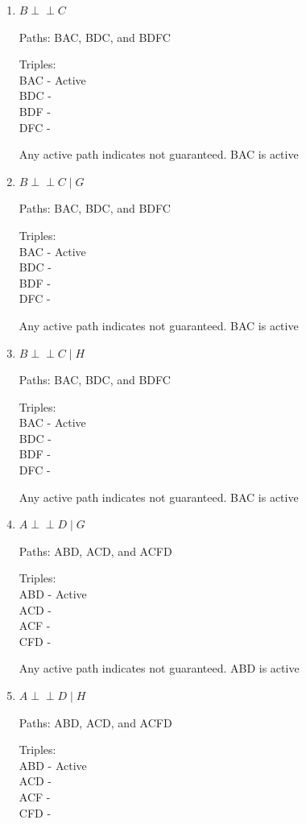 \documentclass[12pt]{article}
\newcommand{\indep}{\perp\!\!\!\perp}
\begin{document}
\begin{enumerate}

\item $B \indep C$ 

Paths: BAC, BDC, and BDFC

Triples: \\
BAC - Active \\
BDC - \\
BDF - \\
DFC - 

Any active path indicates not guaranteed. BAC is active

\item $B \indep C \mid G$ 

Paths: BAC, BDC, and BDFC

Triples: \\
BAC - Active \\
BDC - \\
BDF - \\
DFC - 

Any active path indicates not guaranteed. BAC is active

\item $B \indep C \mid H$ 

Paths: BAC, BDC, and BDFC

Triples: \\
BAC - Active \\
BDC - \\
BDF - \\
DFC - 

Any active path indicates not guaranteed. BAC is active

\item $A \indep D \mid G$ 

Paths: ABD, ACD, and ACFD

Triples: \\
ABD - Active \\
ACD - \\
ACF -  \\
CFD - 

Any active path indicates not guaranteed. ABD is active

\item $A \indep D \mid H$

Paths: ABD, ACD, and ACFD

Triples: \\
ABD - Active \\
ACD - \\
ACF -  \\
CFD - 


\end{enumerate}
\end{document}
